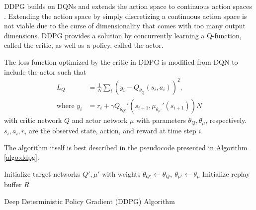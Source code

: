 DDPG builds on DQNs and extends the action space to continuous action spaces \cite{lillicrap2015continuous}.
Extending the action space by simply discretizing a continuous action space is not viable due to the curse of dimensionality that comes with too many output dimensions.
DDPG provides a solution by concurrently learning a Q-function, called the critic, as well as a policy, called the actor.

The loss function optimized by the critic in DDPG is modified from DQN to include the actor such that
\begin{align}
	L_Q &= \frac{1}{N}\sum_{i} \left(
		y_i - Q_{\theta_Q}(s_i, a_i)
	\right)^2, \label{eq:ddpg-lq}\\
	\text{where }y_i &= r_i + \gamma Q_{\theta_{Q'}}'(s_{i+1}, \mu_{\theta_{\mu'}}'(s_{i+1})) \label{eq:ddpg-y}
N\end{align}
with critic network $Q$ and actor network $\mu$ with parameters $\theta_Q, \theta_\mu$, respectively.
$s_i, a_i, r_i$ are the observed state, action, and reward at time step $i$.

The algorithm itself is best described in the pseudocode presented in Algorithm \ref{algo:ddpg}.

\begin{algorithm}
	\SetAlgoLined
	Initialize target networks $Q', \mu'$ with weights $\theta_{Q'} \leftarrow \theta_Q,~\theta_{\mu'} \leftarrow \theta_\mu$\;
	Initialize replay buffer $R$\;
	\caption{Deep Deterministic Policy Gradient (DDPG) Algorithm}\label{algo:ddpg}
\end{algorithm}

